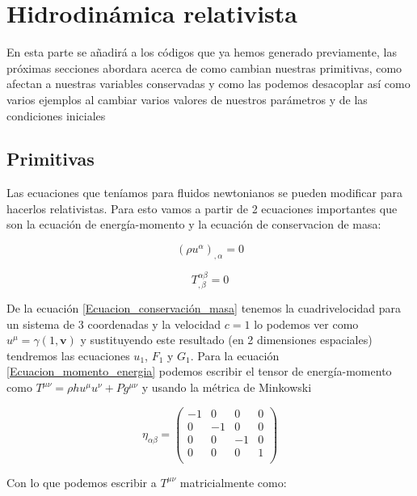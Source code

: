 \documentclass[12pt,a4paper]{book}
\begin{document}
\section{Hidrodinámica relativista}
En esta parte se añadirá a los códigos que ya hemos generado previamente, las próximas secciones abordara acerca de como cambian nuestras primitivas, como afectan a nuestras variables conservadas y como las podemos desacoplar así como varios ejemplos al cambiar varios valores de nuestros parámetros y de las condiciones iniciales

\subsection{Primitivas}
Las ecuaciones que teníamos para fluidos newtonianos se pueden modificar para hacerlos relativistas. Para esto vamos a partir de 2 ecuaciones importantes que son la ecuación de energía-momento y la ecuación de conservacion de masa:

\begin{equation}\label{Ecuacion_conservación_masa}
\left( \rho u^{\alpha} \right)_{, \alpha} =0
\end{equation}

\begin{equation}\label{Ecuacion_momento_energia}
T_{, \beta}^{\alpha \beta}=0
\end{equation}

De la ecuación \ref{Ecuacion_conservación_masa} tenemos la cuadrivelocidad para un sistema de 3 coordenadas y la velocidad $c=1$ lo podemos ver como $u^{\mu}=\gamma \left( 1, \textbf{v}\right)$ y sustituyendo este resultado (en 2 dimensiones espaciales) tendremos las ecuaciones $u_1$, $F_1$ y $G_1$. Para la ecuación \ref{Ecuacion_momento_energia} podemos escribir el tensor de energía-momento como $T^{\mu \nu} = \rho h u^{\mu} u^{\nu} + Pg^{\mu \nu}$ y usando la métrica de Minkowski

\begin{equation}
\eta_{\alpha \beta}= 
\begin{pmatrix}
 -1 & 0 & 0 & 0 \\
 0 & -1 & 0 & 0 \\
 0 & 0 & -1 & 0 \\
 0 & 0 & 0 & 1 \\
\end{pmatrix}
\end{equation}

Con lo que podemos escribir a $T^{\mu \nu}$ matricialmente como:
\end{document}
